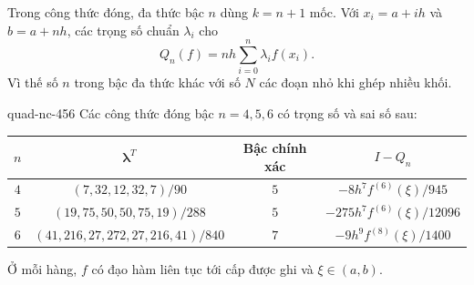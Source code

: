 \documentclass[12pt,a4paper,oneside]{book}
\numberwithin{algorithm}{chapter}
\theoremstyle{definition}
\begin{document}
Trong công thức đóng, đa thức bậc $n$ dùng $k=n+1$ mốc. Với $x_i=a+ih$ và $b=a+nh$, các trọng số chuẩn $\lambda_i$ cho
\[
 Q_n(f)=nh\sum_{i=0}^n\lambda_i f(x_i).
\]
Vì thế số $n$ trong bậc đa thức khác với số $N$ các đoạn nhỏ khi ghép nhiều khối.

\begin{menhde}{}{quad-nc-456}
Các công thức đóng bậc $n=4,5,6$ có trọng số và sai số sau:
\begin{center}\small
\begin{tabular}{c|c|c|c}
\toprule
$n$ & $\boldsymbol\lambda^T$ & Bậc chính xác & $I-Q_n$\\
\midrule
$4$ & $(7,32,12,32,7)/90$ & $5$ & $-8h^7f^{(6)}(\xi)/945$\\
$5$ & $(19,75,50,50,75,19)/288$ & $5$ & $-275h^7f^{(6)}(\xi)/12096$\\
$6$ & $(41,216,27,272,27,216,41)/840$ & $7$ & $-9h^9f^{(8)}(\xi)/1400$\\
\bottomrule
\end{tabular}\end{center}
Ở mỗi hàng, $f$ có đạo hàm liên tục tới cấp được ghi và $\xi\in(a,b)$.
\end{menhde}
\end{document}

